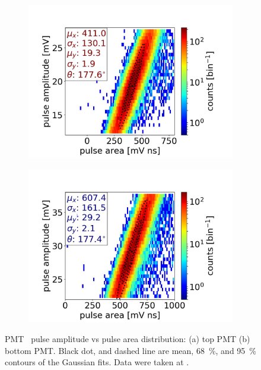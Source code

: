 \begin{figure}[!h]
	\centering
	\begin{subfigure}[b]{\halfwidth}
		\centering
		\includegraphics[width=\textwidth,clip,trim={0 0 0 0},angle=0,origin=c]{Figures/GasTest/DatasetQuality/topPMTArea65831.jpg}
		\caption{}
		\label{fig:PMTAmpArea top}
	\end{subfigure}
	\begin{subfigure}[b]{\halfwidth}
		\centering
		\includegraphics[width=\textwidth,clip,trim={0 0 0 0}]{Figures/GasTest/DatasetQuality/botPMTArea65831.jpg}
		\caption{}
		\label{fig:PMTAmpArea bottom}
	\end{subfigure}
	\caption[PMT \sphe\ pulse amplitude vs pulse area distribution]{PMT \sphe\ pulse amplitude vs pulse area distribution: (a) top PMT (b) bottom PMT. Black dot, and dashed line are mean, \SI{68}{\percent}, and \SI{95}{\percent} contours of the Gaussian fits. Data were taken at .}
	\label{fig:PMTAmpArea}
\end{figure}
